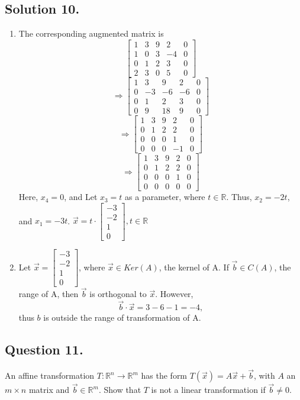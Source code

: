 \documentclass{article}
\begin{document}
\subsection*{Solution 10.}
\begin{enumerate}
    \item 
The corresponding augmented matrix is
\[\left[\begin{array}{ccccc}1&3&9&2&0\\1&0&3&-4&0\\0&1&2&3&0\\2&3&0&5&0\end{array}\right]\]
\[\Rightarrow\left[\begin{array}{ccccc}1&3&9&2&0\\0&-3&-6&-6&0\\0&1&2&3&0\\0&9&18&9&0\end{array}\right]\]
\[\Rightarrow\left[\begin{array}{ccccc}1&3&9&2&0\\0&1&2&2&0\\0&0&0&1&0\\0&0&0&-1&0\end{array}\right]\]
\[\Rightarrow\left[\begin{array}{ccccc}1&3&9&2&0\\0&1&2&2&0\\0&0&0&1&0\\0&0&0&0&0\end{array}\right]\]
Here, $x_4=0$, and Let $x_3=t$ as a parameter, where $t\in\mathbb{R}$.\newline
Thus, $x_2=-2t$, and $x_1=-3t$. $\vec{x}=t\cdot \left[\begin{array}{c}-3\\-2\\1\\0\end{array}\right],t\in\mathbb{R}$
\item Let $\vec{x}=\left[\begin{array}{c}-3\\-2\\1\\0\end{array}\right]$, where $\vec{x}\in Ker(A)$, the kernel of A.
If $\vec{b}\in C(A)$, the range of A, then $\vec{b}$ is orthogonal to $\vec{x}$. However,
\[\vec{b}\cdot\vec{x}=3-6-1=-4,\]
thus $b$ is outside the range of transformation of A.
\end{enumerate}
\subsection*{Question 11.}
An affine transformation $T:\mathbb{R}^n \rightarrow \mathbb{R}^m$ has the form $T(\Vec{x})=A\Vec{x}+\Vec{b}$, with $A$ an $m\times n$ matrix and $\Vec{b}\in \mathbb{R}^m$. Show that $T$ is not a linear transformation if $\Vec{b}\neq 0$.
\end{document}
